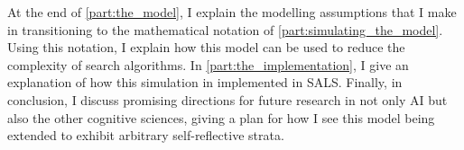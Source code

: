 At the end of \autoref{part:the_model}, I explain the modelling
assumptions that I make in transitioning to the mathematical notation
of \autoref{part:simulating_the_model}.  Using this notation, I
explain how this model can be used to reduce the complexity of search
algorithms.  In \autoref{part:the_implementation}, I give an
explanation of how this simulation in implemented in SALS.  Finally,
in conclusion, I discuss promising directions for future research in
not only AI but also the other cognitive sciences, giving a plan for
how I see this model being extended to exhibit arbitrary
self-reflective strata.

